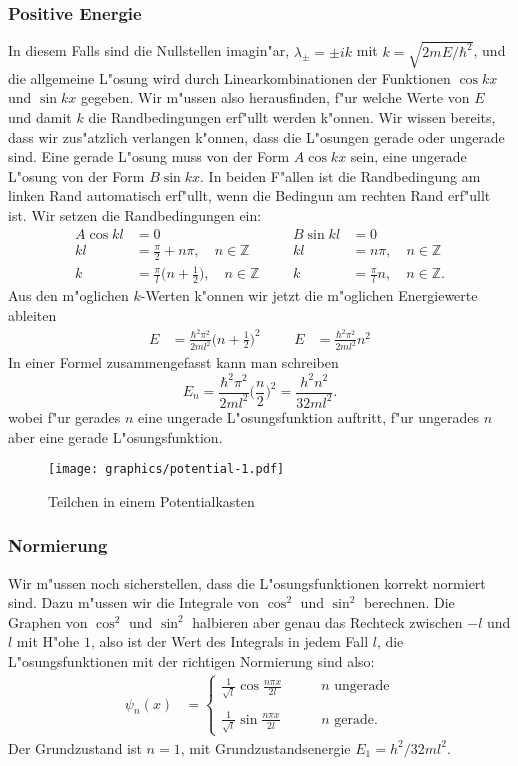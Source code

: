 \subsubsection{Positive Energie}
In diesem Falls sind die Nullstellen imagin"ar, $\lambda_\pm=\pm ik$
mit $k=\sqrt{2mE/\hbar^2}$,
und die allgemeine L"osung wird durch Linearkombinationen der Funktionen
$\cos kx$ und $\sin kx$ gegeben.
Wir m"ussen also herausfinden, f"ur welche Werte von $E$ und damit $k$
die Randbedingungen erf"ullt werden k"onnen.
Wir wissen bereits, dass wir zus"atzlich verlangen k"onnen, dass die
L"osungen gerade oder ungerade sind.
Eine gerade L"osung muss von der Form $A\cos kx$ sein, eine ungerade
L"osung von der Form $B\sin kx$.
In beiden F"allen ist die Randbedingung am linken Rand automatisch
erf"ullt, wenn die Bedingun am rechten Rand erf"ullt ist.
Wir setzen die Randbedingungen ein:
\begin{align*}
A\cos kl&=0
	&&&
		B\sin kl&=0\\
kl&=\frac{\pi}2+n\pi,\quad n\in\mathbb Z
	&&&
		kl&=n\pi,\quad n\in\mathbb Z\\
k&=\frac{\pi}{l}\biggl(n+\frac12\biggr),\quad n\in\mathbb Z
	&&&
		k&=\frac{\pi}{l}n,\quad n\in\mathbb Z.
\end{align*}
Aus den m"oglichen $k$-Werten k"onnen wir jetzt die m"oglichen 
Energiewerte ableiten
\begin{align*}
E&=\frac{\hbar^2\pi^2}{2ml^2}\biggl(n+\frac12\biggr)^2
&&&
E&=\frac{\hbar^2\pi^2}{2ml^2}n^2
\end{align*}
In einer Formel zusammengefasst kann man schreiben
\[
E_n
=
\frac{\hbar^2\pi^2}{2ml^2}\biggl(\frac{n}{2}\biggr)^2
=
\frac{h^2n^2}{32ml^2}.
\]
wobei f"ur gerades $n$ eine ungerade L"osungsfunktion auftritt,
f"ur ungerades $n$ aber eine gerade L"osungsfunktion.
\begin{figure}
\centering
\texttt{[image: graphics/potential-1.pdf]}
\caption{Teilchen in einem Potentialkasten
\label{skript:potentialkasten}}
\end{figure}

\subsubsection{Normierung}
Wir m"ussen noch sicherstellen, dass die L"osungsfunktionen korrekt
normiert sind.
Dazu m"ussen wir die Integrale von $\cos^2$ und $\sin^2$ berechnen.
Die Graphen von $\cos^2$ und $\sin^2$ halbieren aber genau das
Rechteck zwischen $-l$ und $l$ mit H"ohe $1$, also ist der Wert
des Integrals in jedem Fall $l$, die L"osungsfunktionen mit
der richtigen Normierung sind also:
\begin{align*}
\psi_n(x)
&=
\begin{cases}
\displaystyle
\frac{1}{\sqrt{l}}\cos\frac{n \pi x}{2l}&\qquad \text{$n$ ungerade}\\
\\
\displaystyle
\frac{1}{\sqrt{l}}\sin\frac{n \pi x}{2l}&\qquad \text{$n$ gerade}.
\end{cases}
\end{align*}
Der Grundzustand ist $n=1$, mit Grundzustandsenergie $E_1=h^2/32ml^2$.

